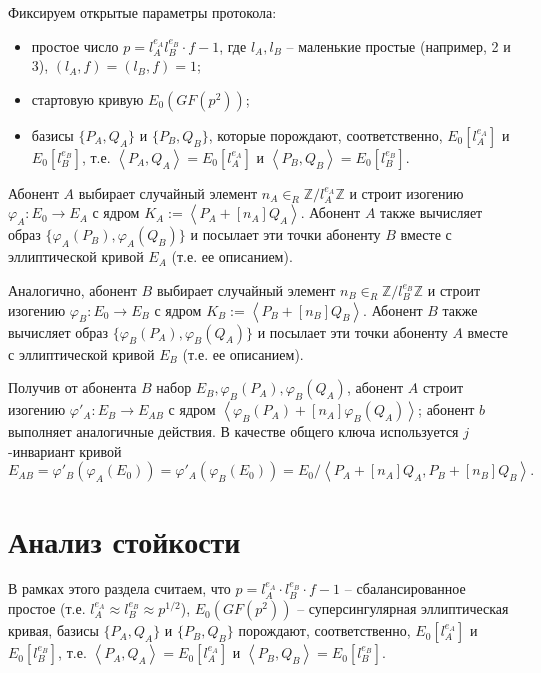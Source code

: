 \documentclass[a4paper,12pt]{article}
\newcommand{\ZZ}{\mathbb{Z}}
\newcommand{\tr}[1]{\left\langle #1\right\rangle}
\theoremstyle{definition}
\begin{document}
Фиксируем открытые параметры протокола:
\begin{itemize}
 \item простое число $  p=l_A^{e_A}l_B^{e_B}\cdot f  - 1$, где $l_A,l_B$ -- маленькие простые (например, 2 и 3),
$(l_A,f)=(l_B,f)=1$;
 \item стартовую кривую $E_0(GF(p^2))$;
 \item базисы $\{P_A,Q_A\}$ и $\{P_B,Q_B\}$, которые порождают, соответственно, $E_0[l_A^{e_A}]$ и $E_0[l_B^{e_B}]$, т.е. $\tr{P_A,Q_A}=E_0[l_A^{e_A}]$ и $\tr{P_B,Q_B}=E_0[l_B^{e_B}]$.

\end{itemize}

 Абонент $A$ выбирает  случайный элемент $ n_A\in_R\ZZ/l_A^{e_A}\ZZ$ %
 и строит изогению $\varphi_A:E_0\to E_A$ с ядром $K_A:=\tr{ P_A+[n_A]Q_A}$.  Абонент $A$  также вычисляет образ $\{\varphi_A(P_B),\varphi_A(Q_B)\}$ и посылает эти точки абоненту $B$ вместе с эллиптической кривой $E_A$ (т.е. ее описанием).
 
 Аналогично, абонент $B$ выбирает   случайный элемент  $ n_B\in_R\ZZ/l_B^{e_B}\ZZ$ %
 и строит изогению $\varphi_B:E_0\to E_B$ с ядром $K_B:=\tr{ P_B+[n_B]Q_B}$.  Абонент $B$  также вычисляет образ $\{\varphi_B(P_A),\varphi_B(Q_A)\}$ и посылает эти точки абоненту $A$ вместе с эллиптической кривой $E_B$ (т.е. ее описанием).
 
 Получив от абонента $B$ набор $E_B, \varphi_B(P_A),\varphi_B(Q_A)$, абонент $A$ строит изогению $\varphi'_A:E_B\to E_{AB}$ с ядром $\tr{ \varphi_B(P_A)+[n_A]\varphi_B(Q_A)}$; абонент $b$ выполняет аналогичные действия.
 В качестве общего ключа  используется $j$-инвариант кривой
 $$
 E_{AB}=\varphi'_B(\varphi_A(E_0))=\varphi'_A(\varphi_B(E_0))=E_0/\tr{ P_A+[n_A]Q_A,  P_B+[n_B]Q_B }.
 $$

\section{Анализ стойкости}\label{analysis}

В рамках этого раздела считаем, что $p=l_A^{e_A}\cdot l_B^{e_B}\cdot f-1$ -- сбалансированное простое (т.е. $l_A^{e_A}\approx l_B^{e_B}\approx p^{1/2}$), $E_0(GF(p^2))$ -- суперсингулярная эллиптическая кривая, базисы $\{P_A,Q_A\}$ и $\{P_B,Q_B\}$
порождают, соответственно, $E_0[l_A^{e_A}]$ и $E_0[l_B^{e_B}]$, т.е. $\tr{P_A,Q_A}=E_0[l_A^{e_A}]$ и $\tr{P_B,Q_B}=E_0[l_B^{e_B}]$. 
\end{document}
